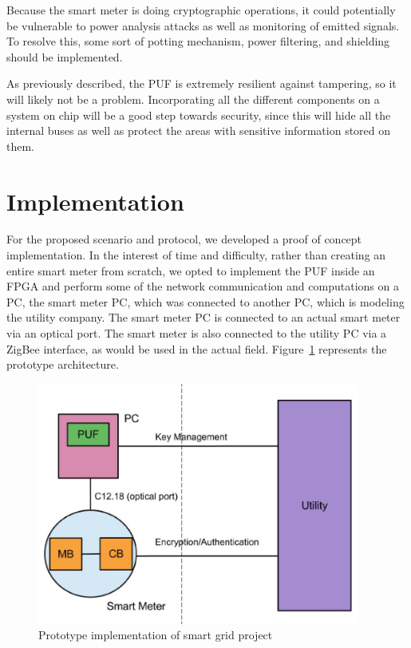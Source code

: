 Because the smart meter is doing cryptographic operations, it could potentially be vulnerable to power analysis
attacks as well as monitoring of emitted signals. To resolve this, some sort of potting mechanism, power filtering,
and shielding should be implemented. 

As previously described, the PUF is extremely resilient against tampering, so it will likely not be a problem.
Incorporating all the different components on a system on chip will be a good step towards security, since this will
hide all the internal buses as well as protect the areas with sensitive information stored on them.

\section{Implementation}
For the proposed scenario and protocol, we developed a proof of concept implementation. In the interest of time and
difficulty, rather than creating an entire smart meter from scratch, we opted to implement the 
PUF inside an FPGA and perform some of the network communication and computations on a PC, the smart meter
PC, which was connected to another PC, which is modeling the utility company. The smart meter PC is connected
to an actual smart meter via an optical port. The smart meter is also connected to the utility PC via a ZigBee interface,
as would be used in the actual field. Figure~\ref{fig:doeimpl} represents the prototype architecture.

\begin{figure}[!ht]
\centering
\includegraphics[width=400px]{images/doe_impl.jpg}
\caption{Prototype implementation of smart grid project}
\label{fig:doeimpl}
\vspace{-25pt}
\end{figure}
\FloatBarrier

